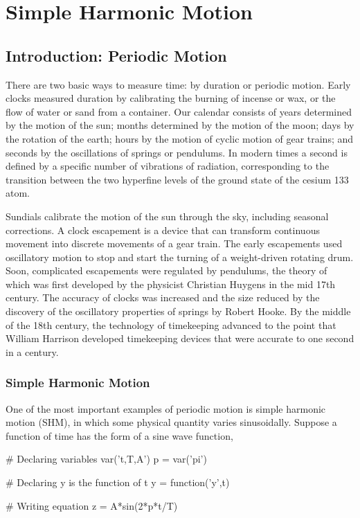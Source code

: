 \chapter{Simple Harmonic Motion}

\section{Introduction: Periodic Motion}

There are two basic ways to measure time: by duration or periodic motion. Early 
clocks measured duration by calibrating the burning of incense or wax, or the 
flow of water or sand from a container. Our calendar consists of years 
determined by the motion of the sun; months determined by the motion of the 
moon; days by the rotation of the earth; hours by the motion of cyclic motion 
of gear trains; and seconds by the oscillations of springs or pendulums. In 
modern times a second is defined by a specific number of vibrations of 
radiation, corresponding to the transition between the two hyperfine levels of 
the ground state of the cesium 133 atom.


Sundials calibrate the motion of the sun through the sky, including seasonal
corrections. A clock escapement is a device that can transform continuous 
movement into discrete movements of a gear train. The early escapements used 
oscillatory motion to stop and start the turning of a weight-driven rotating 
drum. Soon, complicated escapements were regulated by pendulums, the theory of 
which was first developed by the physicist Christian Huygens in the mid 17th 
century. The accuracy of clocks was increased and the size reduced by the 
discovery of the oscillatory properties of springs by Robert Hooke. By the 
middle of the 18th century, the technology of timekeeping advanced to the point 
that William Harrison developed timekeeping devices that were accurate to one 
second in a century. 

\subsection{Simple Harmonic Motion}
One of the most important examples of periodic motion is simple harmonic motion 
(SHM), in which some physical quantity varies sinusoidally. Suppose a function 
of time has the form of a sine wave function,

\begin{sagesilent}
# Declaring variables
var('t,T,A')
p = var('pi')

# Declaring y is the function of t
y = function('y',t)

# Writing equation
z = A*sin(2*p*t/T)
\end{sagesilent}

